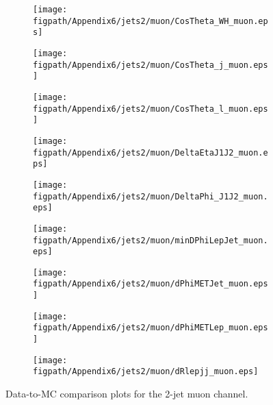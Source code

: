 \begin{figure}[!hbtp]
    \centering
    \begin{subfigure}[t]{0.317\textwidth}
        \texttt{[image: \\figpath/Appendix6/jets2/muon/CosTheta\_WH\_muon.eps]}
    \end{subfigure}
    \begin{subfigure}[t]{0.317\textwidth}
        \texttt{[image: \\figpath/Appendix6/jets2/muon/CosTheta\_j\_muon.eps]}
    \end{subfigure}
    \begin{subfigure}[t]{0.317\textwidth}
        \texttt{[image: \\figpath/Appendix6/jets2/muon/CosTheta\_l\_muon.eps]}
    \end{subfigure}

    \begin{subfigure}[t]{0.317\textwidth}
        \texttt{[image: \\figpath/Appendix6/jets2/muon/DeltaEtaJ1J2\_muon.eps]}
    \end{subfigure}
    \begin{subfigure}[t]{0.317\textwidth}
        \texttt{[image: \\figpath/Appendix6/jets2/muon/DeltaPhi\_J1J2\_muon.eps]}
    \end{subfigure}
    \begin{subfigure}[t]{0.317\textwidth}
        \texttt{[image: \\figpath/Appendix6/jets2/muon/minDPhiLepJet\_muon.eps]}
    \end{subfigure}

    \begin{subfigure}[t]{0.317\textwidth}
        \texttt{[image: \\figpath/Appendix6/jets2/muon/dPhiMETJet\_muon.eps]}
    \end{subfigure}
    \begin{subfigure}[t]{0.317\textwidth}
        \texttt{[image: \\figpath/Appendix6/jets2/muon/dPhiMETLep\_muon.eps]}
    \end{subfigure}
    \begin{subfigure}[t]{0.317\textwidth}
        \texttt{[image: \\figpath/Appendix6/jets2/muon/dRlepjj\_muon.eps]}
    \end{subfigure}
    \caption{Data-to-MC comparison plots for the 2-jet muon channel.}
    \label{fig:comparison_plots_jets2_muon_1}
\end{figure}

